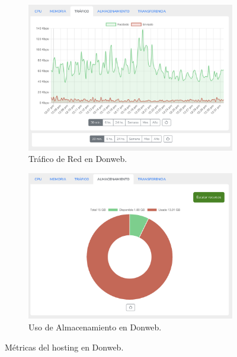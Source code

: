 \begin{figure}[H]
    \begin{subfigure}[b]{0.45\textwidth}
        \centering
        \includegraphics[width=\textwidth]{Figures/PortalWeb/Trafico-Donweb.png}
        \caption{Tráfico de Red en Donweb.}
        \label{fig:trafico-donweb}
    \end{subfigure}
    \hfill
    \begin{subfigure}[b]{0.45\textwidth}
        \centering
        \includegraphics[width=\textwidth]{Figures/PortalWeb/Almacenamiento-Donweb.png}
        \caption{Uso de Almacenamiento en Donweb.}
        \label{fig:almacenamiento-donweb}
    \end{subfigure}
    
    \caption{Métricas del hosting en Donweb.}
    \label{fig:metricas-donweb}
\end{figure}


